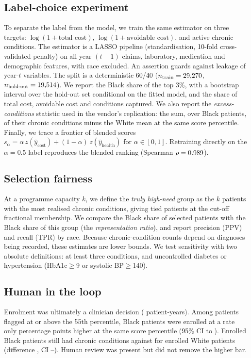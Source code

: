 \documentclass[conference]{IEEEtran}
\begin{document}
\subsection{Label-choice experiment}
To separate the label from the model, we train the same estimator on three targets: $\log(1+\text{total cost})$, $\log(1+\text{avoidable cost})$, and active chronic conditions. The estimator is a LASSO pipeline (standardisation, 10-fold cross-validated penalty) on all year-$(t-1)$ claims, laboratory, medication and demographic features, with race excluded. An assertion guards against leakage of year-$t$ variables. The split is a deterministic 60/40 ($n_{\text{train}}=29{,}270$, $n_{\text{hold-out}}=19{,}514$). We report the Black share of the top 3\%, with a bootstrap interval over the hold-out set conditional on the fitted model, and the share of total cost, avoidable cost and conditions captured. We also report the \emph{excess-conditions} statistic used in the vendor's replication: the sum, over Black patients, of their chronic conditions minus the White mean at the same score percentile. Finally, we trace a frontier of blended scores $s_\alpha=\alpha\,z(\hat{y}_{\text{cost}})+(1-\alpha)\,z(\hat{y}_{\text{health}})$ for $\alpha\in[0,1]$. Retraining directly on the $\alpha=0.5$ label reproduces the blended ranking (Spearman $\rho=0.989$).

\subsection{Selection fairness}
At a programme capacity $k$, we define the \emph{truly high-need} group as the $k$ patients with the most realised chronic conditions, giving tied patients at the cut-off fractional membership. We compare the Black share of selected patients with the Black share of this group (the \emph{representation ratio}), and report precision (PPV) and recall (TPR) by race. Because chronic-condition counts depend on diagnoses being recorded, these estimates are lower bounds. We test sensitivity with two absolute definitions: at least three conditions, and uncontrolled diabetes or hypertension (HbA1c$\geq$9 or systolic BP$\geq$140).

\subsection{Human in the loop}
\label{sec:human}
Enrolment was ultimately a clinician decision (\NEnrolled{} patient-years). Among patients flagged at or above the 55th percentile, Black patients were enrolled at a rate only \EnrolGap{} percentage points higher at the same score percentile (95\% CI \EnrolGapLo{} to \EnrolGapHi). Enrolled Black patients still had \EnrolCondB{} chronic conditions against \EnrolCondW{} for enrolled White patients (difference \EnrolCondGap, CI \EnrolCondGapLo--\EnrolCondGapHi). Human review was present but did not remove the higher bar.
\end{document}
